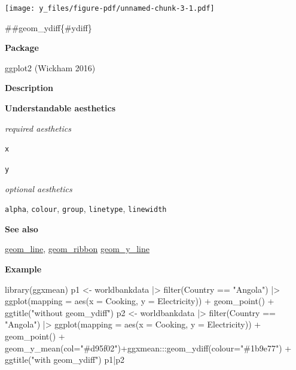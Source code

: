 \documentclass[
  letterpaper,
  DIV=11,
  numbers=noendperiod]{scrreprt}
\newenvironment{Shaded}{\begin{snugshade}}{\end{snugshade}}
\newcommand{\AttributeTok}[1]{\textcolor[rgb]{0.40,0.45,0.13}{#1}}
\newcommand{\FunctionTok}[1]{\textcolor[rgb]{0.28,0.35,0.67}{#1}}
\newcommand{\NormalTok}[1]{\textcolor[rgb]{0.00,0.23,0.31}{#1}}
\newcommand{\OtherTok}[1]{\textcolor[rgb]{0.00,0.23,0.31}{#1}}
\newcommand{\SpecialCharTok}[1]{\textcolor[rgb]{0.37,0.37,0.37}{#1}}
\newcommand{\StringTok}[1]{\textcolor[rgb]{0.13,0.47,0.30}{#1}}
\begin{document}
\texttt{[image: y\_files/figure-pdf/unnamed-chunk-3-1.pdf]}

\#\#geom\_ydiff\{\#ydiff\}

\textbf{Package}

ggplot2 (Wickham 2016)

\textbf{Description}

\textbf{Understandable aesthetics}

\emph{required aesthetics}

\texttt{x}

\texttt{y}

\emph{optional aesthetics}

\texttt{alpha}, \texttt{colour}, \texttt{group}, \texttt{linetype},
\texttt{linewidth}

\textbf{See also}

\hyperref[line]{geom\_line}, \hyperref[ribbon]{geom\_ribbon}
\hyperref[y_line]{geom\_y\_line}

\textbf{Example}

\begin{Shaded}
\begin{Highlighting}[]
\FunctionTok{library}\NormalTok{(ggxmean)}
\NormalTok{p1 }\OtherTok{\textless{}{-}}\NormalTok{ worldbankdata }\SpecialCharTok{|\textgreater{}} 
  \FunctionTok{filter}\NormalTok{(Country }\SpecialCharTok{==} \StringTok{"Angola"}\NormalTok{) }\SpecialCharTok{|\textgreater{}}
  \FunctionTok{ggplot}\NormalTok{(}\AttributeTok{mapping =} \FunctionTok{aes}\NormalTok{(}\AttributeTok{x =}\NormalTok{ Cooking, }\AttributeTok{y =}\NormalTok{ Electricity)) }\SpecialCharTok{+}
\FunctionTok{geom\_point}\NormalTok{()  }\SpecialCharTok{+} \FunctionTok{ggtitle}\NormalTok{(}\StringTok{"without geom\_ydiff"}\NormalTok{)}
\NormalTok{p2 }\OtherTok{\textless{}{-}}\NormalTok{ worldbankdata }\SpecialCharTok{|\textgreater{}} 
  \FunctionTok{filter}\NormalTok{(Country }\SpecialCharTok{==} \StringTok{"Angola"}\NormalTok{) }\SpecialCharTok{|\textgreater{}}
  \FunctionTok{ggplot}\NormalTok{(}\AttributeTok{mapping =} \FunctionTok{aes}\NormalTok{(}\AttributeTok{x =}\NormalTok{ Cooking, }\AttributeTok{y =}\NormalTok{ Electricity)) }\SpecialCharTok{+}
\FunctionTok{geom\_point}\NormalTok{() }\SpecialCharTok{+}
  \FunctionTok{geom\_y\_mean}\NormalTok{(}\AttributeTok{col=}\StringTok{"\#d95f02"}\NormalTok{)}\SpecialCharTok{+}\NormalTok{ggxmean}\SpecialCharTok{:::}\FunctionTok{geom\_ydiff}\NormalTok{(}\AttributeTok{colour=}\StringTok{"\#1b9e77"}\NormalTok{) }\SpecialCharTok{+} 
  \FunctionTok{ggtitle}\NormalTok{(}\StringTok{"with geom\_ydiff"}\NormalTok{)}
\NormalTok{p1}\SpecialCharTok{|}\NormalTok{p2}
\end{Highlighting}
\end{Shaded}
\end{document}
